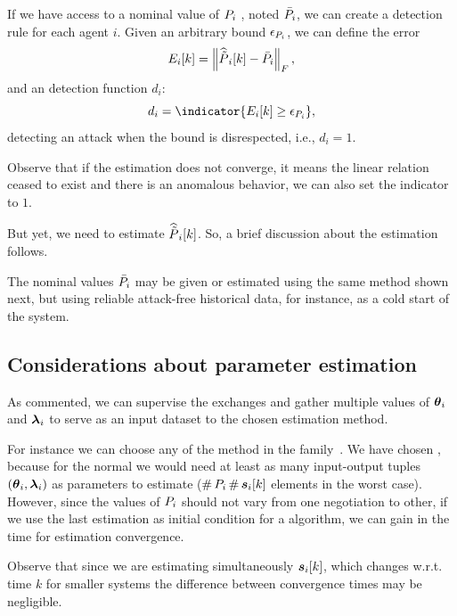 \documentclass[../main.tex]{subfiles}
\begin{document}
If we have access to a nominal value of ${P}_{i}$ , noted $\bar{{P}}_{i}$, we can create a detection rule for each agent $i$.
Given an arbitrary bound $\epsilon_{{P}_{i}}$, we can define the error
\begin{equation}
  E_{i}[k] =\left\lVert\widehat{\tilde{P}}_{i}[k]-\bar{{P}}_{i}\right\rVert_{F},
\end{equation}
and an detection function $d_{i}$:
\begin{equation}
  d_{i}=\indicator{E_{i}[k]\geq\epsilon_{\Plin}},
\end{equation}
detecting an attack when the bound is disrespected, i.e., $d_{i}=1$.

\begin{remark}
  Observe that if the estimation does not converge, it means the linear relation ceased to exist and there is an anomalous behavior, we can also set the indicator to $1$.
\end{remark}

But yet, we need to estimate $\widehat{\tilde{P}}_{i}[k]$.
So, a brief discussion about the estimation follows.

\begin{remark}
  The nominal values $\bar{{P}}_{i}$ may be given or estimated using the same method shown next, but using reliable attack-free historical data, for instance, as a cold start of the system.
\end{remark}


\subsection{Considerations about parameter estimation}\label{sec:about-estimation}
As commented, we can supervise the exchanges and gather multiple values of $\boldsymbol{\theta}_i$ and $\boldsymbol{\lambda}_i$ to serve as an input dataset to the chosen estimation method.

For instance we can choose any of the method in the \LS{} family~\cite{AstroemWittenmark1989}.
We have chosen \RLS{}, because for the normal \LS{} we would need at least as many input-output tuples $(\boldsymbol{\theta}_i,\boldsymbol{\lambda}_i)$ as parameters to estimate ($\operatorname{\#}{P}_{i}\operatorname{\#}\boldsymbol{s}_{i}[k]$ elements in the worst case).
However, since the values of ${P}_{i}$ should not vary from one negotiation to other, if we use the last estimation as initial condition for a \RLS{} algorithm, we can gain in the time for estimation convergence.
\begin{remark}
  Observe that since we are estimating simultaneously $\boldsymbol{s}_{i}[k]$, which changes w.r.t. time $k$ for smaller systems the difference between convergence times may be negligible.
\end{remark}
\end{document}
